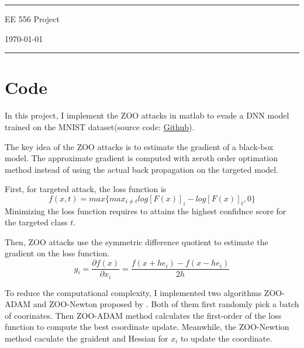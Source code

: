 \documentclass[a4paper]{article}
\begin{document}

\fancyhead[C]{}
\hrule \medskip %
\begin{minipage}{0.295\textwidth} 
\raggedright
\footnotesize

\end{minipage}
\begin{minipage}{0.4\textwidth} 
\centering 
\large 
EE 556 Project\\ 
\normalsize 
\end{minipage}
\begin{minipage}{0.295\textwidth} 
\raggedleft
\today\hfill\\
\end{minipage}
\medskip\hrule 
\bigskip


\section{Code}
In this project, I implement the ZOO attacks in matlab to evade a DNN model trained on the MNIST dataset(source code: \href{https://github.com/Moirai7/ee556/}{Github}).

The key idea of the ZOO attacks is to estimate the gradient of a black-box model. The approximate gradient  is computed with zeroth order optimation method instead of using the actual back propagation on the targeted model. 

First, for targeted attack, the loss function is 
\begin{equation}
f(x,t) = max\{max_{i\neq t}log[F(x)]_i - log[F(x)]_t, 0\}
\end{equation} 
Minimizing the loss function requires to attains the highest confidnce score for the targeted class $t$.

Then, ZOO attacks use the symmetric difference quotient to estimate the gradient on the loss function.
\begin{equation}
g_i = \frac{\partial f(x)}{\partial x_i} = \frac{f(x+he_i)-f(x-he_i)}{2h}
\end{equation}

To reduce the computational complexity, I implemented two algorithms ZOO-ADAM and ZOO-Newton proposed by \cite{1}. Both of them first randomly pick a batch of coorinates. Then ZOO-ADAM method calculates the first-order of the loss function to compute the best coordinate update. Meanwhile, the ZOO-Newtion method caculate the graident and Hessian for $x_i$ to update the coordinate.
\end{document}
